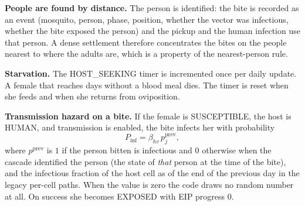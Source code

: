 \documentclass[11pt,a4paper]{article}
\begin{document}
\textbf{People are found by distance.} The person is identified: the bite is
recorded as an event (mosquito, person, phase, position, whether the vector was
infectious, whether the bite exposed the person) and the pickup and the
human infection use that person. A dense settlement therefore concentrates the
bites on the people nearest to where the adults are, which is a property of
the nearest-person rule.

\textbf{Starvation.} The HOST\_SEEKING timer is incremented once per daily
update. A female that reaches  days without a blood meal dies. The timer
is reset when she feeds and when she returns from oviposition.

\textbf{Transmission hazard on a bite.} If the female is SUSCEPTIBLE, the
host is HUMAN, and transmission is enabled, the bite infects her with
probability
\begin{equation}\label{eq:pinf}
P_{\text{inf}}=\beta_{hv}\,p^{\text{prev}}_j,
\end{equation}
where $p^{\text{prev}}$ is $1$ if the person bitten is infectious and $0$
otherwise when the cascade identified the person (the state of
\emph{that} person at the time of the bite), and the infectious fraction of
the host cell as of the end of the previous day in the legacy per-cell
paths. When the value is zero the code draws no random number at all. On
success she becomes EXPOSED with EIP progress 0.
\end{document}
